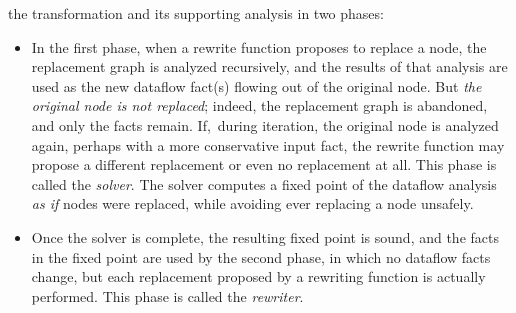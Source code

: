 \documentclass[blockstyle,preprint,nocopyrightspace]{sigplanconf}
\newcommand{\authornote}[1]{{\em #1}}
\def\authornote#1{\unskip\relax}
\newcommand{\simon}[1]{\authornote{SLPJ: #1}}
\newcommand\seclabel[1]{\label{sec:#1}}
\begin{document}
the transformation
and its supporting
analysis in two phases:\seclabel{solver-phase}
\begin{itemize}
\item
In the first phase, when a rewrite function proposes to replace a
node, the replacement graph is analyzed recursively, and the results
of that analysis are used as the new dataflow
fact(s) flowing out of the original node.
But \emph{the original node is not replaced}; indeed, the replacement
graph is abandoned, and only the facts remain.
If,~during iteration, the original node is analyzed again, perhaps
with a more conservative input fact, the rewrite function may propose
a different replacement or even no replacement at all.
This phase is called the \emph{solver}.
The solver computes a fixed point of the dataflow analysis
\emph{as if} nodes were replaced, while avoiding ever replacing a node
unsafely.
\simon{The rewrite functions must presumably satisfy
some monotonicity property.  Something like: given a more informative
fact, the rewrite function will rewrite a node to a more informative graph
(in the fact lattice.).
\textbf{NR}: actually the only obligation of the rewrite function is
to preserve observable behavior.  There's no requirement that it be
monotonic or indeed that it do anything useful.  It just has to
preserve semantics (and be a pure function of course).
\textbf{SLPJ} In that case I think I could cook up a program that
would never reach a fixpoint. Imagine a liveness analysis with a loop;
x is initially unused anywhere.
At some assignment node inside the loop, the rewriter behaves as follows: 
if (and only if) x is dead downstream, 
make it alive by rewriting the assignment to mention x.
Now in each successive iteration x will go live/dead/live/dead etc.  I
maintain my claim that rewrite functions must satisfy some
monotonicity property.
\textbf{JD}: in your example, x cannot go dead/live/dead/live
because facts are monotonic at labels
(the join won't let a live variable go dead).
And of course, we check for fixed point at labels.
If the lattice has finite ascending chains, the only way we can
think of not to terminate is infinite ``deep rewriting.''
}
\item
Once the solver is complete, the resulting fixed point is sound,
and the facts in the fixed point are used by the second phase, in which
no dataflow facts change, but
each replacement proposed by a rewriting function is actually
performed.
This phase is called the \emph{rewriter}.
\end{itemize}
\end{document}
